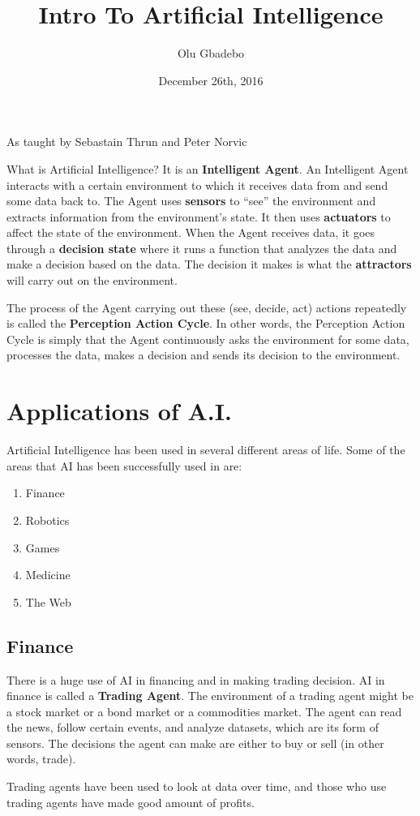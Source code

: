 \documentclass[12pt]{article}
\begin{document}
\title{Intro To Artificial Intelligence}
\author{Olu Gbadebo}
\date{December 26th, 2016}
\maketitle

\begin{center}
{\small As taught by Sebastain Thrun and Peter Norvic\\}
\vfill
\end{center}

\setlength{\parindent}{10ex}
What is Artificial Intelligence? It is an \textbf{Intelligent Agent}. An Intelligent Agent interacts with a certain environment to which it receives data from and send some data back to. The Agent uses \textbf{sensors} to \enquote{see} the environment and extracts information from the environment's state. It then uses \textbf{actuators} to affect the state of the environment. When the Agent receives data, it goes through a \textbf{decision state} where it runs a function that analyzes the data and make a decision based on the data. The decision it makes is what the \textbf{attractors} will carry out on the environment.\par
The process of the Agent carrying out these (see, decide, act) actions repeatedly is called the \textbf{Perception Action Cycle}. In other words, the Perception Action Cycle is simply that the Agent continuously asks the environment for some data, processes the data, makes a decision and sends its decision to the environment.

\section*{Applications of A.I.}
Artificial Intelligence has been used in several different areas of life. Some of the areas that AI has been successfully used in are:
\begin{enumerate}
\item Finance
\item Robotics
\item Games
\item Medicine
\item The Web
\end{enumerate}
\subsection*{Finance}
There is a huge use of AI in financing and in making trading decision. AI in finance is called a \textbf{Trading Agent}. The environment of a trading agent might be a stock market or a bond market or a commodities market. The agent can read the news, follow certain events, and analyze datasets, which are its form of sensors. The decisions the agent can make are either to buy or sell (in other words, trade). \par
Trading agents have been used to look at data over time, and those who use trading agents have made good amount of profits.
\end{document}

